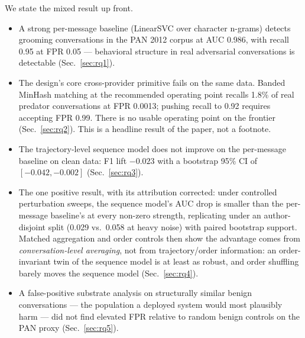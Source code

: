 \documentclass[11pt]{article}
\begin{document}
We state the mixed result up front.
\begin{itemize}[leftmargin=1.5em]
\item A strong per-message baseline (LinearSVC over character n-grams) detects grooming conversations in the PAN 2012 corpus at AUC 0.986, with recall 0.95 at FPR 0.05 --- behavioral structure in real adversarial conversations is detectable (Sec.~\ref{sec:rq1}).
\item The design's core cross-provider primitive fails on the same data. Banded MinHash matching at the recommended operating point recalls 1.8\% of real predator conversations at FPR 0.0013; pushing recall to 0.92 requires accepting FPR 0.99. There is no usable operating point on the frontier (Sec.~\ref{sec:rq2}). This is a headline result of the paper, not a footnote.
\item The trajectory-level sequence model does not improve on the per-message baseline on clean data: F1 lift $-0.023$ with a bootstrap 95\% CI of $[-0.042, -0.002]$ (Sec.~\ref{sec:rq3}).
\item The one positive result, with its attribution corrected: under controlled perturbation sweeps, the sequence model's AUC drop is smaller than the per-message baseline's at every non-zero strength, replicating under an author-disjoint split (0.029 vs.\ 0.058 at heavy noise) with paired bootstrap support. Matched aggregation and order controls then show the advantage comes from \emph{conversation-level averaging}, not from trajectory/order information: an order-invariant twin of the sequence model is at least as robust, and order shuffling barely moves the sequence model (Sec.~\ref{sec:rq4}).
\item A false-positive substrate analysis on structurally similar benign conversations --- the population a deployed system would most plausibly harm --- did not find elevated FPR relative to random benign controls on the PAN proxy (Sec.~\ref{sec:rq5}).
\end{itemize}
\end{document}
